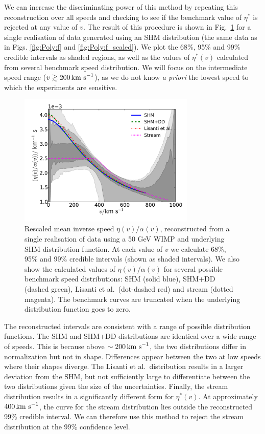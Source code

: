 
We can increase the discriminating power of this method by repeating this reconstruction over all speeds and checking to see if the benchmark value of $\eta^*$ is rejected at any value of $v$. The result of this procedure is shown in Fig.~\ref{fig:Poly:eta} for a single realisation of data generated using an SHM distribution (the same data as in Figs. \ref{fig:Poly:f} and \ref{fig:Poly:f_scaled}). We plot the 68\%, 95\% and 99\% credible intervals as shaded regions, as well as the values of $\eta^*(v)$ calculated from several benchmark speed distribution. We will focus on the intermediate speed range ($v \gtrsim 200 \,\textrm{km s}^{-1}$), as we do not know \textit{a priori} the lowest speed to which the experiments are sensitive.


\begin{figure}[t]
\centering
  \includegraphics[width=0.75\textwidth]{Poly/SHM_lores.pdf}
  \caption{Rescaled mean inverse speed $\eta(v)/\alpha(v)$, reconstructed from a single realisation of data using a 50 GeV WIMP and underlying SHM distribution function. At each value of $v$ we calculate 68\%, 95\% and 99\% credible intervals (shown as shaded intervals). We also show the calculated values of $\eta(v)/\alpha(v)$ for several possible benchmark speed distributions: SHM (solid blue), SHM+DD (dashed green), Lisanti et al.\ (dot-dashed red) and stream (dotted magenta). The benchmark curves are truncated when the underlying distribution function goes to zero.}
  \label{fig:Poly:eta}
\end{figure}

The reconstructed intervals are consistent with a range of possible distribution functions. The SHM and SHM+DD distributions are identical over a wide range of speeds. This is because above $\sim 200 \,\textrm{km s}^{-1}$, the two distributions differ in normalization but not in shape. Differences appear between the two at low speeds where their shapes diverge. The Lisanti et al.\ distribution results in a larger deviation from the SHM, but not sufficiently large to differentiate between the two distributions given the size of the uncertainties. Finally, the stream distribution results in a significantly different form for $\eta^*(v)$. At approximately $400 \,\textrm{km s}^{-1}$, the curve for the stream distribution lies outside the reconstructed 99\% credible interval. We can therefore use this method to reject the stream distribution at the 99\% confidence level.

